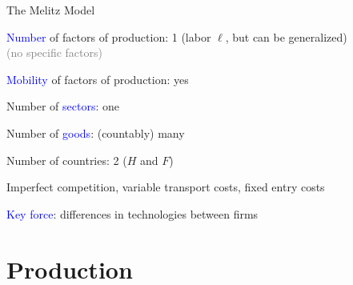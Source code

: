 \documentclass[notes,11pt, aspectratio=169, xcolor=table]{beamer}
\newcommand{\blue}[1]{\textcolor{blue}{#1}}
\newenvironment{wideitemize}{\itemize\addtolength{\itemsep}{10pt}}{\enditemize}
\begin{document}
\begin{frame}{The Melitz Model}
    \begin{wideitemize}
        \item \blue{Number} of factors of production: 1 (labor $\ell$, but can be generalized)\\
        \qquad \textcolor{gray}{(no specific factors)}
        
    \item<2-> \blue{Mobility} of factors of production: yes
    
    \item<3-> Number of \blue{sectors}: one 

    \item<4-> Number of \blue{goods}: (countably) many   

    \item<5-> Number of countries: 2 ($H$ and $F$)

    \item<6-> Imperfect competition, variable transport costs, fixed entry costs

    \item<6-> \blue{Key force}: differences in technologies between firms
    \end{wideitemize}    
\end{frame}

\section{Production}
\end{document}
